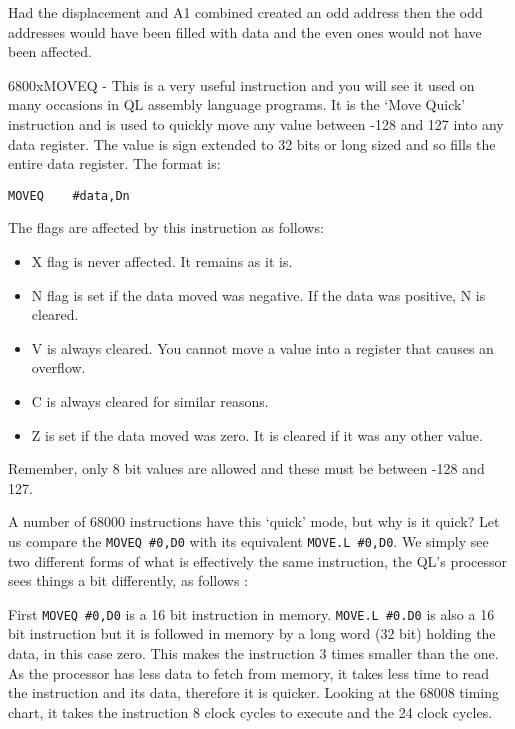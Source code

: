 Had the displacement and A1 combined created an odd address then the
    odd addresses would have been filled with data and the even ones would not
    have been affected.

\mc6800x{MOVEQ} -{} This is a very useful instruction and you will see it used
    on many occasions in QL assembly language programs. It is the `Move Quick'
    instruction and is used to quickly move any value between -{}128 and 127
    into any data register. The value is sign extended to 32 bits or long
    sized and so fills the entire data register. The format is:

\begin{lstlisting}[firstnumber=1,]
          MOVEQ    #data,Dn
\end{lstlisting}

The flags are affected by this instruction as follows:
\begin{itemize}[itemsep=0pt]

\item{}X flag is never affected. It remains as it is.


\item{}N flag is set if the data moved was negative. If the data was
        positive, N is cleared.


\item{}V is always cleared. You cannot move a value into a register
        that causes an overflow.


\item{}C is always cleared for similar reasons.


\item{}Z is set if the data moved was zero. It is cleared if it was any
        other value.

\end{itemize}

Remember, only 8 bit values are allowed and these must be between
    -{}128 and 127.

A number of 68000 instructions have this `quick' mode, but why is it
    quick? Let us compare the \lstinline{MOVEQ #0,D0} with its equivalent \lstinline{MOVE.L #0,D0}.
    We simply see two different forms of what is effectively the same
    instruction, the QL's processor sees things a bit differently, as follows
   :

First \lstinline{MOVEQ #0,D0} is a 16 bit instruction in memory. \lstinline{MOVE.L #0.D0} is
    also a 16 bit instruction but it is followed in memory by a long word (32
    bit) holding the data, in this case zero. This makes the  instruction
    3 times smaller than the  one. As the processor has less data to
    fetch from memory, it takes less time to read the instruction and its
    data, therefore it is quicker. Looking at the 68008 timing chart, it takes
    the  instruction 8 clock cycles to execute and the  24 clock
    cycles.

